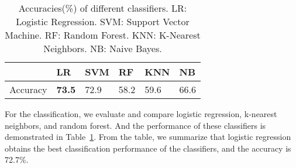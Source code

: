 \begin{table}[]
\centering
\begin{tabular}{|l|l|l|l|l|l|}
\hline
         & LR            & SVM  & RF   & KNN   & NB   \\ \hline
Accuracy & \textbf{73.5} & 72.9 & 58.2 & 59.6  & 66.6 \\ \hline
\end{tabular}
\caption{Accuracies(\%) of different classifiers. LR: Logistic Regression. SVM: Support Vector Machine. RF: Random Forest. KNN: K-Nearest Neighbors. NB: Naive Bayes.}
\label{tab:classifier}
\end{table}

For the classification, we evaluate and compare logistic regression, k-nearest neighbors, and random forest. And the performance of these classifiers is demonstrated in Table~\ref{tab:classifier}. From the table, we summarize that logistic regression obtains the best classification performance of the classifiers, and the accuracy is 72.7\%.


